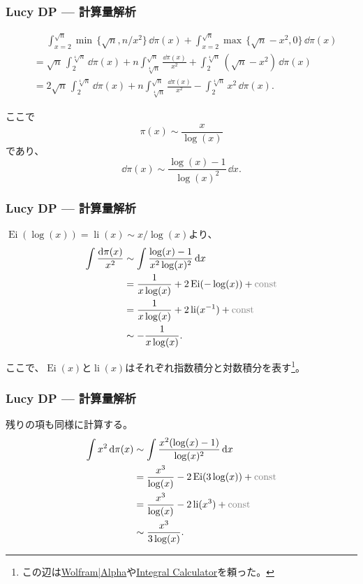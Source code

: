 \documentclass[
  lualatex,
  ja=standard,
  compress,
  hyperref={colorlinks, urlcolor=magenta, linkcolor=blue!55!black},
  dvipsnames,
  svgnames,
]{beamer}
\newcommand{\Ei}[1]{\operatorname{Ei}(#1)}
\newcommand{\li}[1]{\operatorname{li}(#1)}
\newcommand{\IntC}{\text{\textcolor{gray}{const}}}
\begin{document}
\begin{frame}
  \frametitle{Lucy DP \theslidetopic{} — 計算量解析}

  $$
  \begin{aligned}
    &\phantom{{}={}} \int_{x=2}^{\sqrt{n}} \min\,\{\sqrt{n}, n/x^2\}\, \dd{\pi(x)}
    + \int_{x=2}^{\sqrt{n}} \max\,\{\sqrt{n}-x^2, 0\} \, \dd{\pi(x)} \\
    &= \sqrt{n}\, \int_2^{\sqrt[4]{n}}\dd{\pi(x)}
    + n\int_{\sqrt[4]{n}}^{\sqrt{n}} \frac{\dd{\pi(x)}}{x^2}
    + \int_2^{\sqrt[4]{n}} (\sqrt{n}-x^2)\, \dd{\pi(x)} \\
    &= 2\sqrt{n}\, \int_2^{\sqrt[4]{n}}\dd{\pi(x)}
    + n\int_{\sqrt[4]{n}}^{\sqrt{n}} \frac{\dd{\pi(x)}}{x^2}
    - \int_2^{\sqrt[4]{n}} x^2\, \dd{\pi(x)}.
  \end{aligned}
  $$

  ここで
  $$ \pi(x) \sim \frac{x}{\log(x)} $$
  であり、
  $$ \dd{\pi(x)} \sim \frac{\log(x)-1}{\log(x)^2}\,\dd{x}. $$
\end{frame}

\begin{frame}
  \frametitle{Lucy DP \theslidetopic{} — 計算量解析}

  $\Ei{\log(x)} = \li{x} \sim x/\log(x)$より、
  $$
  \begin{aligned}
    \int \frac{\dd{\pi(x)}}{x^2}
    &\sim \int \frac{\log(x)-1}{x^2\log(x)^2}\,\dd{x} \\
    &= \frac{1}{x\log(x)} + 2\Ei{-\log(x)} + \IntC \\
    &= \frac{1}{x\log(x)} + 2\li{x^{-1}} + \IntC \\
    &\sim -\frac{1}{x\log(x)}.
    \end{aligned}
  $$

  ここで、$\Ei{x}$と$\li{x}$はそれぞれ指数積分と対数積分を表す\footnote{この辺は\href{https://wolframalpha.com}{Wolfram|Alpha}や\href{https://www.integral-calculator.com/}{Integral Calculator}を頼った。}。
\end{frame}

\begin{frame}
  \frametitle{Lucy DP \theslidetopic{} — 計算量解析}

  残りの項も同様に計算する。
  $$
  \begin{aligned}
    \int x^2\,\dd{\pi(x)}
    &\sim \int \frac{x^2(\log(x)-1)}{\log(x)^2}\,\dd{x} \\
    &= \frac{x^3}{\log(x)} - 2\Ei{3\log(x)} + \IntC \\
    &= \frac{x^3}{\log(x)} - 2\li{x^3} + \IntC \\
    &\sim \frac{x^3}{3\log(x)}.
  \end{aligned}
  $$
\end{frame}
\end{document}
